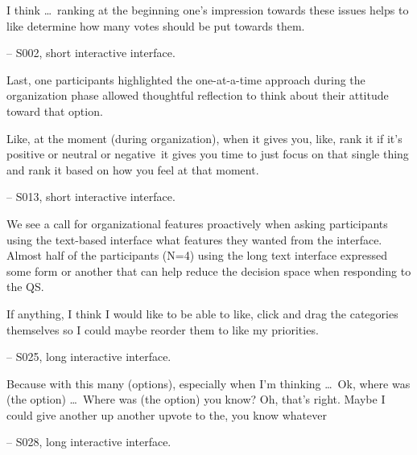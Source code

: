 \begin{displayquote}
I think \ldots\ ranking at the beginning one's impression towards these issues helps to like determine how many votes should be put towards them. 

\noindent \hfill -- S002, short interactive interface.
\end{displayquote}

Last, one participants highlighted the one-at-a-time approach during the organization phase allowed thoughtful reflection to think about their attitude toward that option.

\begin{displayquote}
Like, at the moment (during organization), when it gives you, like, rank it if it's positive or neutral or negative~\bracketellipsis it gives you time to just focus on that single thing and rank it based on how you feel at that moment.
    
    \noindent \hfill -- S013, short interactive interface.
\end{displayquote}

We see a call for organizational features proactively when asking participants using the text-based interface what features they wanted from the interface. Almost half of the participants (N=4) using the long text interface expressed some form or another that can help reduce the decision space when responding to the QS.

\begin{displayquote}
    If anything, I think I would like to be able to like, click and drag the categories themselves so I could maybe reorder them to like my priorities.
        
        \noindent \hfill -- S025, long interactive interface.
\end{displayquote}

\begin{displayquote}
    Because with this many (options), especially when I'm thinking \ldots\ Ok, where was (the option) \ldots\ Where was (the option) you know? Oh, that's right. Maybe I could give another up another upvote to the, you know whatever~\bracketellipsis
        
        \noindent \hfill -- S028, long interactive interface.
\end{displayquote}
